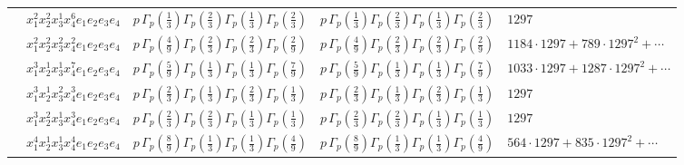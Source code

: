 \documentclass[11pt]{article}
\begin{document}
\begin{table}[ht]
{\begin{tabular}{@{}lllll@{}}
 & $x_{1}^{2} x_{2}^{2} x_{3}^{1} x_{4}^{6}  e_{1} e_{2} e_{3} e_{4}$ & $p \, \Gamma_p \left( \frac{1}{3} \right) \Gamma_p \left( \frac{2}{3} \right) \Gamma_p \left( \frac{1}{3} \right) \Gamma_p \left( \frac{2}{3} \right)$ & $p \, \Gamma_p \left( \frac{1}{3} \right) \Gamma_p \left( \frac{2}{3} \right) \Gamma_p \left( \frac{1}{3} \right) \Gamma_p \left( \frac{2}{3} \right)$ & $1297$ \\
 & $x_{1}^{2} x_{2}^{2} x_{3}^{2} x_{4}^{2}  e_{1} e_{2} e_{3} e_{4}$ & $p \, \Gamma_p \left( \frac{4}{9} \right) \Gamma_p \left( \frac{2}{3} \right) \Gamma_p \left( \frac{2}{3} \right) \Gamma_p \left( \frac{2}{9} \right)$ & $p \, \Gamma_p \left( \frac{4}{9} \right) \Gamma_p \left( \frac{2}{3} \right) \Gamma_p \left( \frac{2}{3} \right) \Gamma_p \left( \frac{2}{9} \right)$ & $1184{\cdot}1297{+}789{\cdot}1297^{2}{+}\cdots$ \\
 & $x_{1}^{3} x_{2}^{1} x_{3}^{1} x_{4}^{7}  e_{1} e_{2} e_{3} e_{4}$ & $p \, \Gamma_p \left( \frac{5}{9} \right) \Gamma_p \left( \frac{1}{3} \right) \Gamma_p \left( \frac{1}{3} \right) \Gamma_p \left( \frac{7}{9} \right)$ & $p \, \Gamma_p \left( \frac{5}{9} \right) \Gamma_p \left( \frac{1}{3} \right) \Gamma_p \left( \frac{1}{3} \right) \Gamma_p \left( \frac{7}{9} \right)$ & $1033{\cdot}1297{+}1287{\cdot}1297^{2}{+}\cdots$ \\
 & $x_{1}^{3} x_{2}^{1} x_{3}^{2} x_{4}^{3}  e_{1} e_{2} e_{3} e_{4}$ & $p \, \Gamma_p \left( \frac{2}{3} \right) \Gamma_p \left( \frac{1}{3} \right) \Gamma_p \left( \frac{2}{3} \right) \Gamma_p \left( \frac{1}{3} \right)$ & $p \, \Gamma_p \left( \frac{2}{3} \right) \Gamma_p \left( \frac{1}{3} \right) \Gamma_p \left( \frac{2}{3} \right) \Gamma_p \left( \frac{1}{3} \right)$ & $1297$ \\
 & $x_{1}^{3} x_{2}^{2} x_{3}^{1} x_{4}^{3}  e_{1} e_{2} e_{3} e_{4}$ & $p \, \Gamma_p \left( \frac{2}{3} \right) \Gamma_p \left( \frac{2}{3} \right) \Gamma_p \left( \frac{1}{3} \right) \Gamma_p \left( \frac{1}{3} \right)$ & $p \, \Gamma_p \left( \frac{2}{3} \right) \Gamma_p \left( \frac{2}{3} \right) \Gamma_p \left( \frac{1}{3} \right) \Gamma_p \left( \frac{1}{3} \right)$ & $1297$ \\
 & $x_{1}^{4} x_{2}^{1} x_{3}^{1} x_{4}^{4}  e_{1} e_{2} e_{3} e_{4}$ & $p \, \Gamma_p \left( \frac{8}{9} \right) \Gamma_p \left( \frac{1}{3} \right) \Gamma_p \left( \frac{1}{3} \right) \Gamma_p \left( \frac{4}{9} \right)$ & $p \, \Gamma_p \left( \frac{8}{9} \right) \Gamma_p \left( \frac{1}{3} \right) \Gamma_p \left( \frac{1}{3} \right) \Gamma_p \left( \frac{4}{9} \right)$ & $564{\cdot}1297{+}835{\cdot}1297^{2}{+}\cdots$ \\

\end{tabular}}
\end{table}
\end{document}
